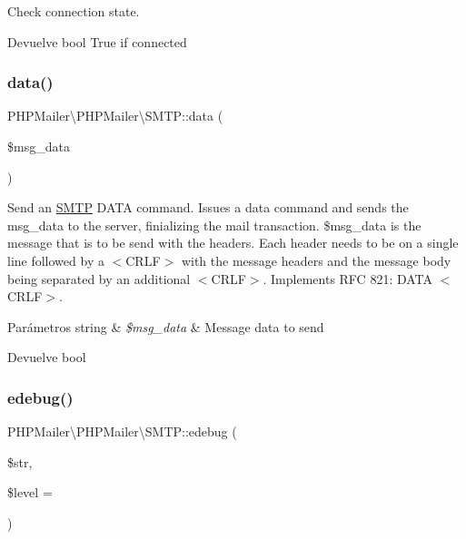 Check connection state.

\begin{DoxyReturn}{Devuelve}
bool True if connected 
\end{DoxyReturn}
\mbox{\label{classPHPMailer_1_1PHPMailer_1_1SMTP_a521b8dadc893ac68f1a3b27e54f7faaa}} 
\subsubsection{\texorpdfstring{data()}{data()}}
{\footnotesize\ttfamily P\+H\+P\+Mailer\textbackslash{}\+P\+H\+P\+Mailer\textbackslash{}\+S\+M\+T\+P\+::data (\begin{DoxyParamCaption}\item[{}]{\$msg\+\_\+data }\end{DoxyParamCaption})}

Send an \hyperlink{classPHPMailer_1_1PHPMailer_1_1SMTP}{S\+M\+TP} D\+A\+TA command. Issues a data command and sends the msg\+\_\+data to the server, finializing the mail transaction. \$msg\+\_\+data is the message that is to be send with the headers. Each header needs to be on a single line followed by a $<$\+C\+R\+L\+F$>$ with the message headers and the message body being separated by an additional $<$\+C\+R\+L\+F$>$. Implements R\+FC 821\+: D\+A\+TA $<$\+C\+R\+L\+F$>$.


\begin{DoxyParams}[1]{Parámetros}
string & {\em \$msg\+\_\+data} & Message data to send\\
\hline
\end{DoxyParams}
\begin{DoxyReturn}{Devuelve}
bool 
\end{DoxyReturn}
\mbox{\label{classPHPMailer_1_1PHPMailer_1_1SMTP_a428c75f1ab137d95c57567459f51e876}} 
\subsubsection{\texorpdfstring{edebug()}{edebug()}}
{\footnotesize\ttfamily P\+H\+P\+Mailer\textbackslash{}\+P\+H\+P\+Mailer\textbackslash{}\+S\+M\+T\+P\+::edebug (\begin{DoxyParamCaption}\item[{}]{\$str,  }\item[{}]{\$level = {} }\end{DoxyParamCaption})\hspace{0.3cm}{\ttfamily [protected]}}

